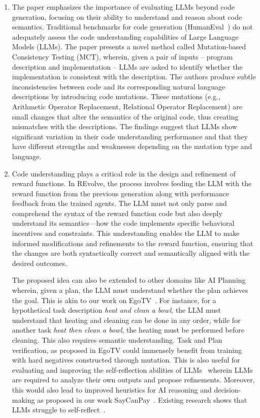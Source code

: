\documentclass[11pt]{article}
\begin{document}
\begin{enumerate}[label=(\alph*),leftmargin=*]
    \item The paper emphasizes the importance of evaluating LLMs beyond code generation, focusing on their ability to understand and reason about code semantics.  Traditional benchmarks for code generation (HumanEval~\cite{humaneval}) do not adequately assess the code understanding capabilities of Large Language Models (LLMs). The paper presents a novel method called Mutation-based Consistency Testing (MCT), wherein, given a pair of inputs – program description and implementation – LLMs are asked to identify whether the implementation is consistent with the description. The authors produce subtle inconsistencies between code and its corresponding natural language descriptions by introducing code mutations. These mutations  (e.g., Arithmetic Operator Replacement, Relational Operator Replacement) are small changes that alter the semantics of the original code, thus creating mismatches with the descriptions. The findings suggest that LLMs show significant variation in their code understanding performance and that they have different strengths and weaknesses depending on the mutation type and language.
    
    \item Code understanding plays a critical role in the design and refinement of reward functions. In REvolve, the process involves feeding the LLM with the reward function from the previous generation along with performance feedback from the trained agents. The LLM must not only parse and comprehend the syntax of the reward function code but also deeply understand its semantics—how the code implements specific behavioral incentives and constraints. This understanding enables the LLM to make informed modifications and refinements to the reward function, ensuring that the changes are both syntactically correct and semantically aligned with the desired outcomes.

    The proposed idea can also be extended to other domains like AI Planning wherein, given a plan, the LLM must understand whether the plan achieves the goal. This is akin to our work on EgoTV~\cite{egotv}. For instance, for a hypothetical task description \emph{heat and clean a bowl}, the LLM must understand that heating and cleaning can be done in any order, while for another task \emph{heat then clean a bowl}, the heating must be performed before cleaning. This also requires semantic understanding. Task and Plan verification, as proposed in EgoTV could immensely benefit from training with hard negatives constructed through mutation. This is also useful for evaluating and improving the self-reflection abilities of LLMs~\cite{selfrefine,reflexion} wherein LLMs are required to analyze their own outputs and propose refinements. Moreover, this would also lead to improved heuristics for AI reasoning and decision-making as proposed in our work SayCanPay~\cite{saycanpay}. Existing research shows that LLMs struggle to self-reflect~\cite{gpt_graph_coloring}.
    

\end{enumerate}
\end{document}
